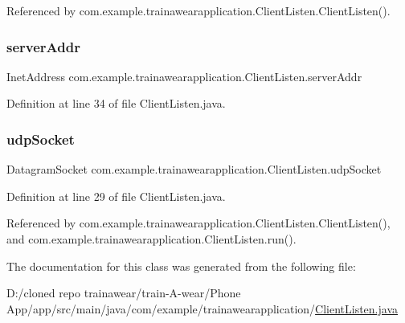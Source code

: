Referenced by com.\+example.\+trainawearapplication.\+Client\+Listen.\+Client\+Listen().

\mbox{\label{classcom_1_1example_1_1trainawearapplication_1_1_client_listen_abc9e0b9f60e38782a9aa64dde9b43273}} 
\subsubsection{\texorpdfstring{serverAddr}{serverAddr}}
{\footnotesize\ttfamily Inet\+Address com.\+example.\+trainawearapplication.\+Client\+Listen.\+server\+Addr}



Definition at line 34 of file Client\+Listen.\+java.

\mbox{\label{classcom_1_1example_1_1trainawearapplication_1_1_client_listen_a008375f58e870216d43730ef43964b61}} 
\subsubsection{\texorpdfstring{udpSocket}{udpSocket}}
{\footnotesize\ttfamily Datagram\+Socket com.\+example.\+trainawearapplication.\+Client\+Listen.\+udp\+Socket\hspace{0.3cm}{\ttfamily [private]}}



Definition at line 29 of file Client\+Listen.\+java.



Referenced by com.\+example.\+trainawearapplication.\+Client\+Listen.\+Client\+Listen(), and com.\+example.\+trainawearapplication.\+Client\+Listen.\+run().



The documentation for this class was generated from the following file\+:\begin{DoxyCompactItemize}
\item 
D\+:/cloned repo trainawear/train-\/\+A-\/wear/\+Phone App/app/src/main/java/com/example/trainawearapplication/\mbox{\hyperlink{_client_listen_8java}{Client\+Listen.\+java}}\end{DoxyCompactItemize}
